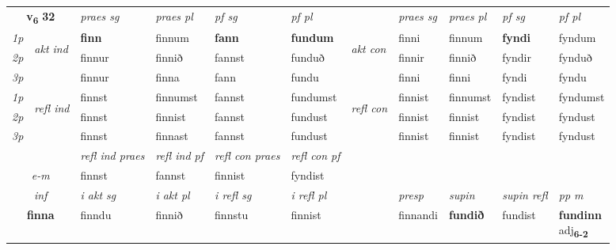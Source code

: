 \noindent
\begin{tabular}{lllllllllll} \toprule
\multicolumn{2}{c}{\textbf{v{\textsubscript{6}}} \Large{\textbf{32}}}  &  \textit{praes sg}  & \textit{praes pl}  &\textit{ pf sg} & \textit{pf pl} &  &  \textit{praes sg}  & \textit{praes pl}  & \textit{pf sg} & \textit{pf pl } \\*
	\cmidrule{3-6} \cmidrule{8-11}
 {\textit{1p}} & \multirow{3}{*}{\begin{turn}{90}\textit{akt ind}\end{turn}} & \textbf{finn} & finnum & \textbf{fann} & \textbf{fundum} & \multirow{3}{*}{\begin{turn}{90}\textit{akt con}\end{turn}} &finni & finnum & \textbf{fyndi} & fyndum\\*
 {\textit{2p}} &  &  finnur  & finnið & fannst & funduð & & finnir & finnið & fyndir & fynduð \\*
{\textit{3p}} &  & finnur & finna & fann & fundu & & finni & finni& fyndi & fyndu \\*
\cmidrule{3-6} \cmidrule{8-11}
 {\textit{1p}} & \multirow{3}{*}{\begin{turn}{90}\textit{refl ind}\end{turn}}  & finnst & finnumst & fannst & fundumst & \multirow{3}{*}{\begin{turn}{90}\textit{refl con}\end{turn}}  &finnist & finnumst & fyndist & fyndumst \\*
 {\textit{2p}} &  & finnst & finnist & fannst & fundust & &finnist & finnist & fyndist & fyndust \\*
 {\textit{3p}}  & & finnst & finnast & fannst & fundust & & finnist & finnist& fyndist & fyndust \\*
\cmidrule{3-6} \cmidrule{8-11}

 & & \textit{refl ind praes} & \textit{refl ind pf} & \textit{refl con praes} & \textit{refl con pf} \\*
 \multicolumn{2}{c}{ \textit{e-m} }& finnst & fannst & finnist & fyndist \\*

\cmidrule{3-11}
   \multicolumn{2}{c}{\textit{inf}}  & \textit{i akt sg} & \textit{i akt pl} & \textit{i refl sg} & \textit{i refl pl} && \textit{presp} & \textit{supin} & \textit{supin refl} & \textit{pp m} \\*
  \multicolumn{2}{c}{\textbf{finna}} & finndu  & finnið & finnstu & finnist && finnandi &  \textbf{fundið} & fundist & \specialcell{\textbf{fundinn} \\ adj\textbf{\textsubscript{6-2}}} \\*
\end{tabular}

